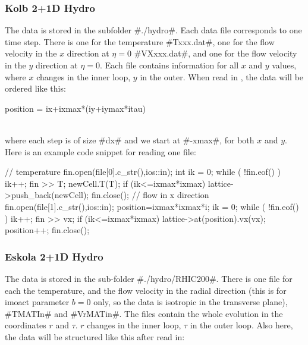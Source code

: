 \subsubsection{Kolb 2+1D Hydro}
\label{kolbdata}
The data is stored in the subfolder #./hydro#.
Each data file corresponds to one time step. There is one for the temperature 
#Txxx.dat#, one for the flow velocity in the $x$ direction at $\eta=0$ 
#VXxxx.dat#, and one for the flow velocity in the $y$ direction at $\eta=0$.
Each file contains information for all $x$ and $y$ values, where $x$ changes in 
the inner loop, $y$ in the outer. When read in , the data will be ordered like this:\\

\begin{boxedverbatim}
 position = ix+ixmax*(iy+iymax*itau) 
\end{boxedverbatim}

~\\
where each step is of size #dx# and we start at #-xmax#, for both $x$ and $y$.
~\\

Here is an example code snippet for reading one file:

\begin{boxedverbatim}
    // temperature
    fin.open(file[0].c_str(),ios::in);
    int ik = 0;
    while ( !fin.eof() )
      {
        ik++;
        fin >> T;
        newCell.T(T);
        if (ik<=ixmax*ixmax) lattice->push_back(newCell);
      }
    fin.close();
    // flow in x direction
    fin.open(file[1].c_str(),ios::in);
    position=ixmax*ixmax*i;
    ik = 0;
    while ( !fin.eof() )
      {
        ik++;
        fin >> vx;
        if (ik<=ixmax*ixmax) 
          {
            lattice->at(position).vx(vx);
            position++;
          }
      }
   fin.close();
\end{boxedverbatim}

\newpage
\subsubsection{Eskola 2+1D Hydro}
\label{eskoladata}
The data is stored in the sub-folder #./hydro/RHIC200#. There is one file for each the 
temperature, and the flow velocity in the radial direction (this is for imoact parameter $b=0$ only, so the data is isotropic in the transverse plane), #TMATIn# and #VrMATin#.
The files contain the whole evolution in the coordinates $r$ and $\tau$. $r$ changes in the inner loop, $\tau$ in the outer loop.
Also here, the data will be structured like this after read in:\\

